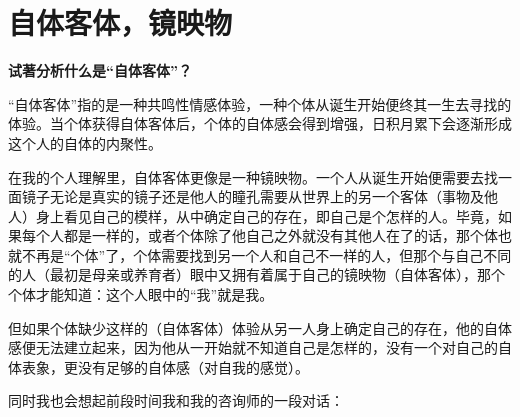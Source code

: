 \chapter{自体客体，镜映物}




\textbf{试著分析什么是“自体客体”？}

“自体客体”指的是一种共鸣性情感体验，一种个体从诞生开始便终其一生去寻找的体验。当个体获得自体客体后，个体的自体感会得到增强，日积月累下会逐渐形成这个人的自体的内聚性。

在我的个人理解里，自体客体更像是一种镜映物。一个人从诞生开始便需要去找一面镜子\pozhehao{}无论是真实的镜子还是他人的瞳孔\pozhehao{}需要从世界上的另一个客体（事物及他人）身上看见自己的模样，从中确定自己的存在，即自己是个怎样的人。毕竟，如果每个人都是一样的，或者个体除了他自己之外就没有其他人在了的话，那个体也就不再是“个体”了，个体需要找到另一个人和自己不一样的人，但那个与自己不同的人（最初是母亲或养育者）眼中又拥有着属于自己的镜映物（自体客体），那个个体才能知道：这个人眼中的“我”就是我。

但如果个体缺少这样的（自体客体）体验\pozhehao{}从另一人身上确定自己的存在，他的自体感便无法建立起来，因为他从一开始就不知道自己是怎样的，没有一个对自己的自体表象，更没有足够的自体感（对自我的感觉）。

同时我也会想起前段时间我和我的咨询师的一段对话：

